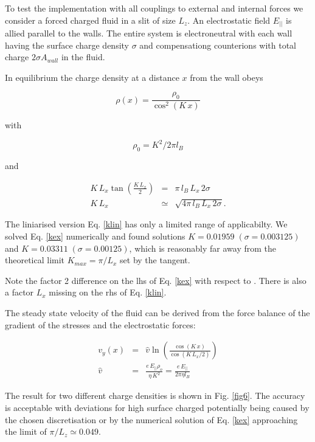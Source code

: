 To test the implementation with all couplings to external and 
internal forces we consider a forced charged fluid in a slit
of size $L_z$. An electrostatic field $E_{||}$ is allied
parallel to the walls. The entire system is electroneutral with 
each wall having the surface charge density $\sigma$ 
and compensationg counterions with total charge $2 \sigma A_{wall}$
in the fluid.

In equilibrium the charge density at a distance $x$ from the wall obeys

\begin{equation}
\rho(x)=\frac{\rho_0}{\cos^2(K\,x)}
\end{equation}

with 

\begin{equation}
\rho_0=K^2/2\pi l_B
\end{equation}

and 

\begin{eqnarray}
K \,L_x \tan\left(\frac{K\, L_x}{2}\right)&=&\pi\, l_B\, L_x\, 2\sigma\label{kex} \\
K \,L_x&\simeq&\sqrt{4\pi \,l_B\,L_x\,2\sigma}\label{klin}.
\end{eqnarray}


The liniarised version Eq. \ref{klin} has only a limited range of applicabilty.
We solved Eq. \ref{kex} numerically and found solutions 
$K=0.01959\; (\sigma=0.003125)$ and $K=0.03311\; (\sigma=0.00125)$, 
which is reasonably far away from the 
theoretical limit $K_{max}=\pi/L_x$ set by the tangent. 

Note the factor 2 difference on the lhs of Eq. \ref{kex} with respect 
to \cite{Capuani, Rotenberg}. There is also a factor $L_x$ missing on 
the rhs of Eq. \ref{klin}.

The steady state velocity of the fluid can be derived from the 
force balance of the gradient of the stresses and the electrostatic
forces:

\begin{eqnarray}
v_y(x)&=&\hat{v} \ln\left(\frac{\cos(K\,x)}{\cos(K\,L_x/2)}\right)\label{vy}\\
\hat{v}&=&\frac{e \,E_{||}\rho_o}{\eta\, K^2}=\frac{e \,E_{||}}{2\pi\eta l_B}\label{vhat}
\end{eqnarray}

The result for two different charge densities is shown in Fig. \ref{fig6}.
The accuracy is acceptable with deviations for high surface 
charged potentially being caused by the chosen discretisation or 
by the numerical solution of Eq. \ref{kex} approaching the limit 
of $\pi/L_z\simeq0.049$.  

